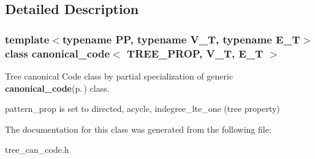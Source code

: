 \subsection{Detailed Description}
\subsubsection*{template$<$typename PP, typename V\_\-T, typename E\_\-T$>$ class canonical\_\-code$<$ TREE\_\-PROP, V\_\-T, E\_\-T $>$}

Tree canonical Code class by partial specialization of generic {\bf canonical\_\-code}{\rm (p.\,\pageref{classcanonical__code})} class. 

pattern\_\-prop is set to directed, acycle, indegree\_\-lte\_\-one (tree property) 



The documentation for this class was generated from the following file:\begin{CompactItemize}
\item 
tree\_\-can\_\-code.h\end{CompactItemize}
